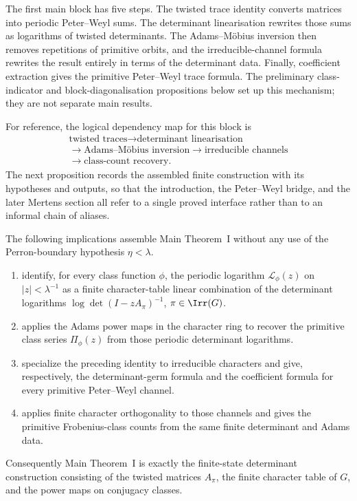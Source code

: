 The first main block has five steps. The twisted trace identity converts
matrices into periodic Peter--Weyl sums. The determinant linearisation
rewrites those sums as logarithms of twisted determinants. The
Adams--M\"obius inversion then removes repetitions of primitive orbits,
and the irreducible-channel formula rewrites the result entirely in
terms of the determinant data. Finally, coefficient extraction gives the
primitive Peter--Weyl trace formula. The preliminary class-indicator and
block-diagonalisation propositions below set up this mechanism; they
are not separate main results.

For reference, the logical dependency map for this block is
\[
\begin{array}{c}
  \text{twisted traces}\to\text{determinant linearisation}\\[2pt]
  \to\text{Adams--M\"obius inversion}\to\text{irreducible channels}\\[2pt]
  \to\text{class-count recovery}.
\end{array}
\]
The next proposition records the assembled finite construction with its
hypotheses and outputs, so that the introduction, the Peter--Weyl bridge, and
the later Mertens section all refer to a single proved interface rather than to
an informal chain of aliases.

\begin{proposition}
  \label{prop:main-theorem-i-assembly-map}
  The following implications assemble Main Theorem~I without any use of
  the Perron-boundary hypothesis \(\eta<\lambda\).
  \begin{enumerate}[label=\textup{(\alph*)},leftmargin=*]
    \item {}
    identify, for every class function \(\phi\), the periodic logarithm
    \(\mathcal L_\phi(z)\) on \(|z|<\lambda^{-1}\) as a finite
    character-table linear combination of the determinant logarithms
    \(\log\det(I-zA_\pi)^{-1}\), \(\pi\in\Irr(G)\).
    \item {} applies the Adams power
    maps in the character ring to recover the primitive class series
    \(\Pi_\phi(z)\) from those periodic determinant logarithms.
    \item {} specialize the preceding identity to
    irreducible characters and give, respectively, the determinant-germ
    formula and the coefficient formula for every primitive Peter--Weyl
    channel.
    \item {} applies finite character
    orthogonality to those channels and gives the primitive Frobenius-class
    counts from the same finite determinant and Adams data.
  \end{enumerate}
  Consequently Main Theorem~I is exactly the finite-state determinant
  construction consisting of the twisted matrices \(A_\pi\), the finite
  character table of \(G\), and the power maps on conjugacy classes.
\end{proposition}

